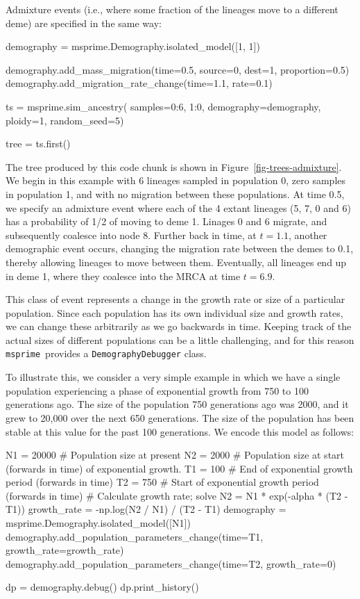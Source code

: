 \documentclass[graybox]{svmult}
\newcommand{\msprime}[0]{\texttt{msprime}}
\begin{document}
Admixture events (i.e., where some fraction of the lineages move to a
different deme) are specified in the same way:

\clearpage
\begin{pythoncode}
demography = msprime.Demography.isolated_model([1, 1])

demography.add_mass_migration(time=0.5, source=0, dest=1, proportion=0.5)
demography.add_migration_rate_change(time=1.1, rate=0.1)

ts  = msprime.sim_ancestry(
    samples={0:6, 1:0},
    demography=demography,
    ploidy=1,
    random_seed=5)

tree = ts.first()
\end{pythoncode}

The tree produced by this code chunk is shown in
Figure~\ref{fig-trees-admixture}.
We begin in this example with 6 lineages sampled in population 0, zero
samples in population 1, and with no migration between these
populations. At time 0.5, we specify an admixture event where each of
the 4 extant lineages (5, 7, 0 and 6) has a probability of 1/2 of moving
to deme 1. Linages 0 and 6 migrate, and subsequently coalesce into node
8. Further back in time, at \(t=1.1\), another demographic event occurs,
changing the migration rate between the demes to 0.1, thereby allowing
lineages to move between them. Eventually, all lineages end up in deme
1, where they coalesce into the MRCA at time \(t=6.9\).

\label{population-parameter-change}

This class of event represents a change in the growth rate or
size of a particular population. Since each population has its own
individual size and growth rates, we can change these arbitrarily as we
go backwards in time. Keeping track of the actual sizes of different
populations can be a little challenging, and for this reason \msprime\
provides a \texttt{DemographyDebugger} class.

To illustrate this, we consider a very simple example in which we have a
single population experiencing a phase of exponential growth from 750
to 100 generations ago. The size of the population 750 generations ago
was 2000, and it grew to 20,000 over the next 650 generations. The size
of the population has been stable at this value for the past 100
generations. We encode this model as follows:

\begin{pythoncode}
N1 = 20000  # Population size at present
N2 = 2000   # Population size at start (forwards in time) of exponential growth.
T1 = 100    # End of exponential growth period (forwards in time)
T2 = 750    # Start of exponential growth period (forwards in time)
# Calculate growth rate; solve N2 = N1 * exp(-alpha * (T2 - T1))
growth_rate = -np.log(N2 / N1) / (T2 - T1)
demography = msprime.Demography.isolated_model([N1])
demography.add_population_parameters_change(time=T1, growth_rate=growth_rate)
demography.add_population_parameters_change(time=T2, growth_rate=0)

dp = demography.debug()
dp.print_history()
\end{pythoncode}
\end{document}
